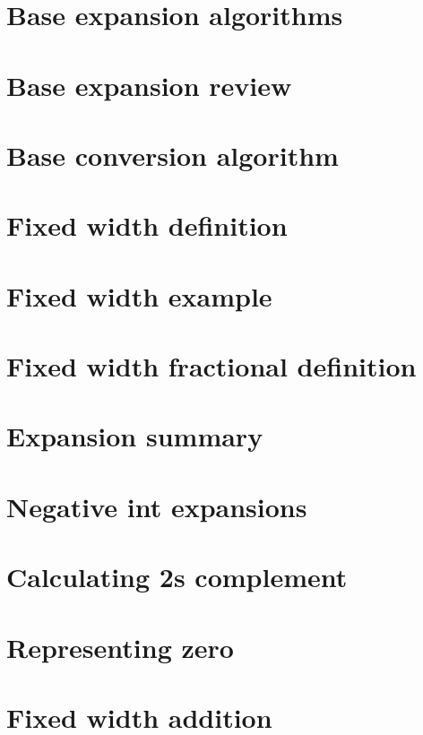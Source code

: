 \section*{Base expansion algorithms}

\vfill
\section*{Base expansion review}

\vfill
\section*{Base conversion algorithm}

\vfill
\section*{Fixed width definition}

\vfill
\section*{Fixed width example}

\vfill
\section*{Fixed width fractional definition}

\vfill
\section*{Expansion summary}

\vfill
\section*{Negative int expansions}

\vfill
\section*{Calculating 2s complement}

\vfill
\section*{Representing zero}

\vfill
\section*{Fixed width addition}

\vfill
